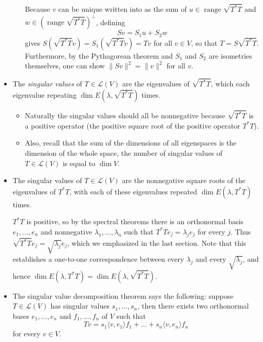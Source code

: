 \documentclass[11pt]{article}
\newcommand{\df}[1]{\textit{\textsf{#1}}}
\renewcommand{\r}{\operatorname{range}}
\renewcommand{\d}{\dim}
\newcommand{\inp}[2]{\langle #1, #2 \rangle}
\newcommand{\nm}[1]{\lVert #1 \rVert}
\newcommand{\LV}{\mathcal{L}(V)}
\begin{document}
\begin{itemize}
\begin{itemize}
    Because $v$ can be unique written into as the sum of $u \in \r \sqrt{T^*T}$ and $w \in (\r \sqrt{T^*T})^\perp$, defining $$Sv = S_1 u+ S_2 w$$ gives $S(\sqrt{T^*T}v) = S_1(\sqrt{T^*T}v) = Tv$ for all $v \in V$, so that $T=S\sqrt{T^*T}$. Furthermore, by the Pythagorean theorem and $S_1$ and $S_2$ are  isometries themselves, one can show $\nm{Sv}^2=\nm{v}^2$ for all $v$.
\end{itemize}
\item The \df{singular values} of $T \in \LV$ are the eigenvalues of $\sqrt{T^*T}$, which each eigenvalue repeating $\d E(\lambda, \sqrt{T^*T})$ times.

\begin{itemize}
\item Naturally the singular values should all be nonnegative because $\sqrt{T^*T}$ is a positive operator (the positive square root of the positive operator $T^*T$).
\item Also, recall that the sum of the dimensions of all eigenspaces is the dimension of the whole space, the number of singular values of $T \in \LV$ is equal to $\d V$.
\end{itemize}

\item The singular values of $T \in \LV$ are the nonnegative square roots of the eigenvalues of $T^*T$, with each of these eigenvalues repeated $\d E(\lambda,T^*T)$ times.

$T^*T$ is positive, so by the spectral theorems there is an orthonormal basis $e_1,\dots,e_n$ and nonnegative $\lambda_1,\dots,\lambda_n$ such that $T^*Te_j = \lambda_j e_j$ for every $j$. Thus $\sqrt{T^*T}e_j=\sqrt{\lambda_j}e_j$, which we emphasized in the last section. Note that this establishes a one-to-one correspondence between every $\lambda_j$ and every $\sqrt{\lambda_j}$, and hence $\d E(\lambda, T^*T) = \d E(\lambda, \sqrt{T^*T})$.

\item The singular value decomposition theorem says the following: suppose $T \in \LV$ has singular values $s_1,\dots,s_n$, then there exists two orthonormal bases $e_1,\dots,e_n$ and $f_1,\dots,f_n$ of $V$ such that $$Tv = s_1\inp{v}{e_1}f_1 + \dots + s_n\inp{v}{e_n}f_n$$ for every $v \in V$.


\end{itemize}
\end{document}
